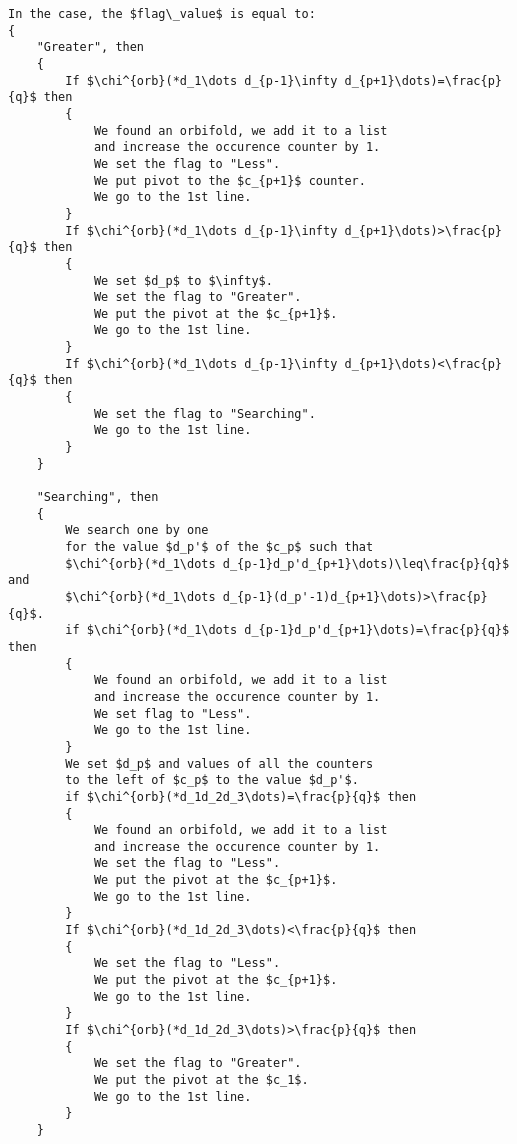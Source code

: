 \begin{lstlisting}[firstnumber=1,consecutivenumbers=true]
In the case, the $flag\_value$ is equal to: 
{
    "Greater", then
    {
        If $\chi^{orb}(*d_1\dots d_{p-1}\infty d_{p+1}\dots)=\frac{p}{q}$ then
        {
            We found an orbifold, we add it to a list 
            and increase the occurence counter by 1. 
            We set the flag to "Less".
            We put pivot to the $c_{p+1}$ counter.
            We go to the 1st line.
        } 
        If $\chi^{orb}(*d_1\dots d_{p-1}\infty d_{p+1}\dots)>\frac{p}{q}$ then
        {
            We set $d_p$ to $\infty$.
            We set the flag to "Greater".
            We put the pivot at the $c_{p+1}$.
            We go to the 1st line.
        }  
        If $\chi^{orb}(*d_1\dots d_{p-1}\infty d_{p+1}\dots)<\frac{p}{q}$ then
        {
            We set the flag to "Searching".
            We go to the 1st line.
        }  
    }
    
    "Searching", then
    {
        We search one by one 
        for the value $d_p'$ of the $c_p$ such that 
        $\chi^{orb}(*d_1\dots d_{p-1}d_p'd_{p+1}\dots)\leq\frac{p}{q}$ and 
        $\chi^{orb}(*d_1\dots d_{p-1}(d_p'-1)d_{p+1}\dots)>\frac{p}{q}$.
        if $\chi^{orb}(*d_1\dots d_{p-1}d_p'd_{p+1}\dots)=\frac{p}{q}$ then 
        {
            We found an orbifold, we add it to a list 
            and increase the occurence counter by 1. 
            We set flag to "Less".
            We go to the 1st line.
        }
        We set $d_p$ and values of all the counters 
        to the left of $c_p$ to the value $d_p'$.
        if $\chi^{orb}(*d_1d_2d_3\dots)=\frac{p}{q}$ then 
        {
            We found an orbifold, we add it to a list 
            and increase the occurence counter by 1. 
            We set the flag to "Less".
            We put the pivot at the $c_{p+1}$.
            We go to the 1st line.
        }
        If $\chi^{orb}(*d_1d_2d_3\dots)<\frac{p}{q}$ then 
        {
            We set the flag to "Less".
            We put the pivot at the $c_{p+1}$.
            We go to the 1st line.
        }
        If $\chi^{orb}(*d_1d_2d_3\dots)>\frac{p}{q}$ then 
        {
            We set the flag to "Greater".
            We put the pivot at the $c_1$.
            We go to the 1st line.
        }
    }
    

\end{lstlisting}
